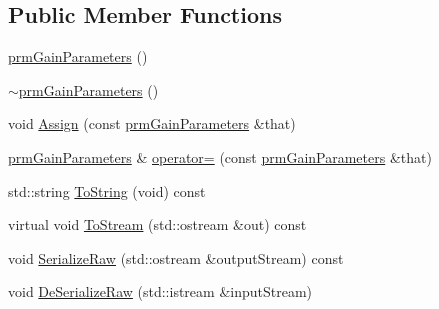 \subsection*{Public Member Functions}
\begin{DoxyCompactItemize}
\item 
\hyperlink{classprm_gain_parameters_aeeb8ecc12e4f0badd632fc94499fca81}{prm\+Gain\+Parameters} ()
\item 
\hyperlink{classprm_gain_parameters_a6241287dd1dcc722f10d911951a09800}{$\sim$prm\+Gain\+Parameters} ()
\item 
void \hyperlink{classprm_gain_parameters_a501603f764895ddf93366c85a7e959db}{Assign} (const \hyperlink{classprm_gain_parameters}{prm\+Gain\+Parameters} \&that)
\item 
\hyperlink{classprm_gain_parameters}{prm\+Gain\+Parameters} \& \hyperlink{classprm_gain_parameters_a54cff625c32a9fffce362fb93afd6d89}{operator=} (const \hyperlink{classprm_gain_parameters}{prm\+Gain\+Parameters} \&that)
\item 
std\+::string \hyperlink{classprm_gain_parameters_aeebeed19398c5a9ef30e9307af23f341}{To\+String} (void) const 
\item 
virtual void \hyperlink{classprm_gain_parameters_a29d0dee95d45080a0bbb6d99a7f7013c}{To\+Stream} (std\+::ostream \&out) const 
\item 
void \hyperlink{classprm_gain_parameters_a818f720b8731f8b53c518251b64b4fca}{Serialize\+Raw} (std\+::ostream \&output\+Stream) const 
\item 
void \hyperlink{classprm_gain_parameters_a9d7a3000a264ff71cafeb6658df942fa}{De\+Serialize\+Raw} (std\+::istream \&input\+Stream)
\end{DoxyCompactItemize}

